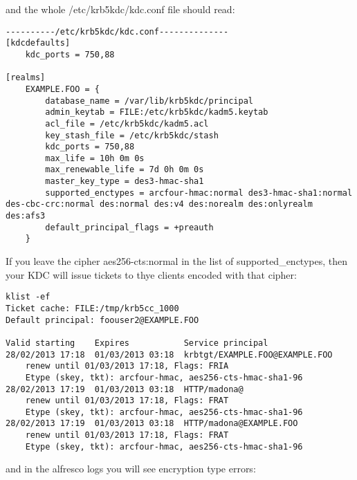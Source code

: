 \documentclass[12pt,a4]{article}
\begin{document}
and the whole /etc/krb5kdc/kdc.conf file should read:

\begin{verbatim}
----------/etc/krb5kdc/kdc.conf--------------
[kdcdefaults]
    kdc_ports = 750,88

[realms]
    EXAMPLE.FOO = {
        database_name = /var/lib/krb5kdc/principal
        admin_keytab = FILE:/etc/krb5kdc/kadm5.keytab
        acl_file = /etc/krb5kdc/kadm5.acl
        key_stash_file = /etc/krb5kdc/stash
        kdc_ports = 750,88
        max_life = 10h 0m 0s
        max_renewable_life = 7d 0h 0m 0s
        master_key_type = des3-hmac-sha1
     	supported_enctypes = arcfour-hmac:normal des3-hmac-sha1:normal des-cbc-crc:normal des:normal des:v4 des:norealm des:onlyrealm des:afs3
        default_principal_flags = +preauth
    }

\end{verbatim}

If you leave the cipher aes256-cts:normal in the list of supported\_enctypes, then your KDC will issue tickets to thye clients encoded with that cipher:


\begin{verbatim}
klist -ef
Ticket cache: FILE:/tmp/krb5cc_1000
Default principal: foouser2@EXAMPLE.FOO

Valid starting    Expires           Service principal
28/02/2013 17:18  01/03/2013 03:18  krbtgt/EXAMPLE.FOO@EXAMPLE.FOO
	renew until 01/03/2013 17:18, Flags: FRIA
	Etype (skey, tkt): arcfour-hmac, aes256-cts-hmac-sha1-96 
28/02/2013 17:19  01/03/2013 03:18  HTTP/madona@
	renew until 01/03/2013 17:18, Flags: FRAT
	Etype (skey, tkt): arcfour-hmac, aes256-cts-hmac-sha1-96 
28/02/2013 17:19  01/03/2013 03:18  HTTP/madona@EXAMPLE.FOO
	renew until 01/03/2013 17:18, Flags: FRAT
	Etype (skey, tkt): arcfour-hmac, aes256-cts-hmac-sha1-96 
\end{verbatim}

and in the alfresco logs you will see encryption type errors:
\end{document}
